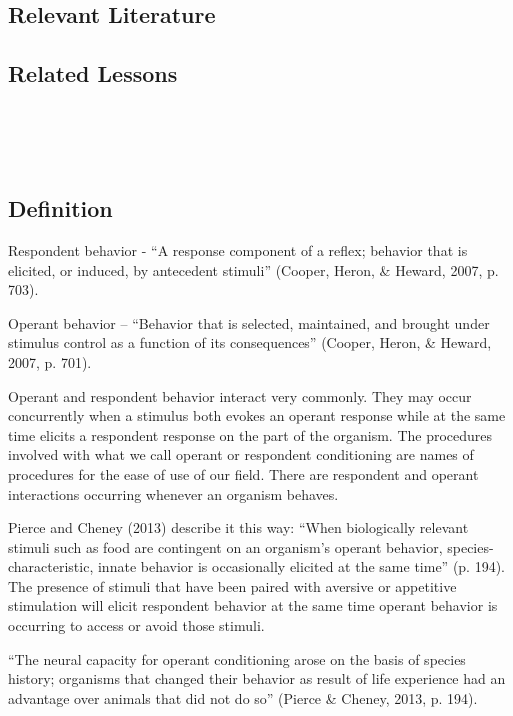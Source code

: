 \subsection{Relevant Literature}
\begin{refsection}
\nocite{cooper2007applied,
        mcallister1969application}
\printbibliography[heading=none]
\end{refsection}
%
\subsection{Related Lessons}
\fourFKFifteen{}\\
\fourFKThirtyOne{}\\
\fourFKThirtyThree{}\\
%
\subsection{Definition}
Respondent behavior - ``A response component of a reflex; behavior that is elicited, or induced, by antecedent stimuli'' (Cooper, Heron, \& Heward, 2007, p. 703).

Operant behavior – ``Behavior that is selected, maintained, and brought under stimulus control as a function of its consequences'' (Cooper, Heron, \& Heward, 2007, p. 701).

Operant and respondent behavior interact very commonly. They may occur concurrently when a stimulus both evokes an operant response while at the same time elicits a respondent response on the part of the organism. The procedures involved with what we call operant or respondent conditioning are names of procedures for the ease of use of our field. There are respondent and operant interactions occurring whenever an organism behaves. 

Pierce and Cheney (2013) describe it this way: ``When biologically relevant stimuli such as food are contingent on an organism's operant behavior, species-characteristic, innate behavior is occasionally elicited at the same time'' (p. 194). The presence of stimuli that have been paired with aversive or appetitive stimulation will elicit respondent behavior at the same time operant behavior is occurring to access or avoid those stimuli.

``The neural capacity for operant conditioning arose on the basis of species history; organisms that changed their behavior as result of life experience had an advantage over animals that did not do so'' (Pierce \& Cheney, 2013, p. 194).

